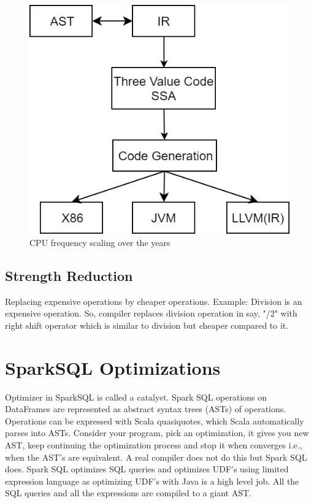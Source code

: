\documentclass[twoside]{article}
\begin{document}
\begin{enumerate}
\begin{figure}[h]
\centering
\includegraphics[scale=0.35]{code_generation.png}
\caption{CPU frequency scaling over the years}
\end{figure}

\end{enumerate}


\subsection{Strength Reduction}

Replacing expensive operations by cheaper operations.
Example: Division is an expensive operation.
              So, compiler replaces division operation in say, "/2" with right shift operator which is similar to division but cheaper compared to it.

\section{SparkSQL Optimizations}

Optimizer in SparkSQL is called a catalyst. Spark SQL operations on DataFrames are represented as abstract syntax trees (ASTs) of operations. Operations can be expressed with Scala quasiquotes, which Scala automatically parses into ASTs. Consider your program, pick an optimization, it gives you new AST, keep continuing the optimization process and stop it when converges i.e., when the AST's are equivalent. A real compiler does not do this but Spark SQL does.
Spark SQL optimizes SQL queries and optimizes UDF's using limited expression language as optimizing UDF's with Java is a high level job. All the SQL queries and all the expressions are compiled to a giant AST.
\end{document}
